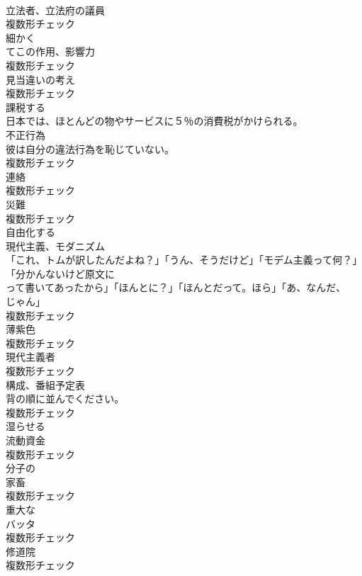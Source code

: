 \documentclass[8pt]{extreport}
\begin{document}
\begin{CJK}{UTF8}{min}
\\	[名詞]	立法者、立法府の議員	
\\	複数形チェック
\\	[副詞]	細かく	
\\	[名詞]	てこの作用、影響力	
\\	複数形チェック
\\	[名詞]	見当違いの考え	
\\	複数形チェック
\\	[動詞]	課税する	
\\	日本では、ほとんどの物やサービスに５％の消費税がかけられる。	
\\	[名詞]	不正行為	
\\	彼は自分の違法行為を恥じていない。	
\\	複数形チェック
\\	[名詞]	連絡	
\\	複数形チェック
\\	[名詞]	災難	
\\	複数形チェック
\\	[動詞]	自由化する	
\\	[名詞]	現代主義、モダニズム	
\\	「これ、トムが訳したんだよね？」「うん、そうだけど」「モデム主義って何？」「分かんないけど原文に 
\\	って書いてあったから」「ほんとに？」「ほんとだって。ほら」「あ、なんだ、
\\	じゃん」	
\\	複数形チェック
\\	[名詞]	薄紫色	
\\	複数形チェック
\\	[名詞]	現代主義者	
\\	複数形チェック
\\	[名詞]	構成、番組予定表	
\\	背の順に並んでください。	
\\	複数形チェック
\\	[動詞]	湿らせる	
\\	[名詞]	流動資金	
\\	複数形チェック
\\	[形容詞]	分子の	
\\	[名詞]	家畜	
\\	複数形チェック
\\	[形容詞]	重大な	
\\	[名詞]	バッタ	
\\	複数形チェック
\\	[名詞]	修道院	
\\	複数形チェック

\end{CJK}
\end{document}
